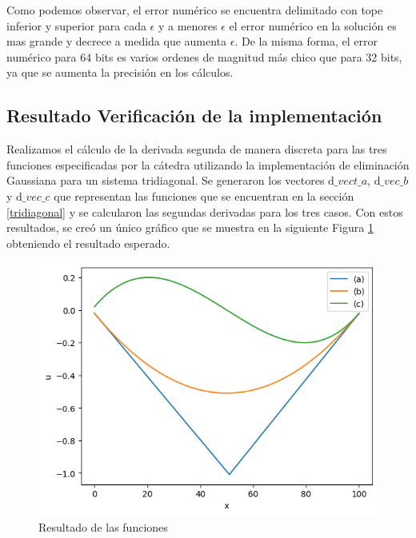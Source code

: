 Como podemos observar, el error numérico se encuentra delimitado con tope inferior y superior para cada $\epsilon$ y a menores $\epsilon$ el error numérico en la solución es mas grande y decrece a medida que aumenta $\epsilon$. De la misma forma, el error numérico para 64 bits es varios ordenes de magnitud más chico que para 32 bits, ya que se aumenta la precisión en los cálculos.

\subsection{Resultado Verificación de la implementación}
\label{resultados derivada}
Realizamos el cálculo de la derivada segunda de manera discreta para las tres funciones especificadas por la cátedra utilizando la implementación de eliminación Gaussiana para un sistema tridiagonal.
Se generaron los vectores d$\_vect\_a$, d$\_vec\_b$  y d$\_vec\_c$ que representan las funciones que se encuentran en la sección \ref{tridiagonal} y se calcularon las segundas derivadas para los tres casos.
Con estos resultados, se creó un único gráfico que se muestra en la siguiente Figura \ref{result_laplaciano} obteniendo el resultado esperado.

\begin{figure}[H]
\centerline{\includegraphics[scale=0.45]{./img/resultado_tridiag}}
\caption{Resultado de las funciones}
\label{result_laplaciano}
\end{figure}

